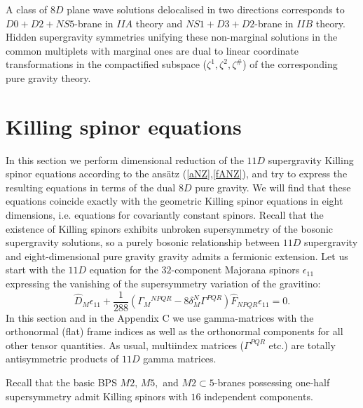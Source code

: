 \documentclass[a4paper,12pt]{article}
\begin{document}
A class of $8D$ plane wave solutions delocalised in two
directions corresponds to $D0+D2+NS5$-brane in $IIA$ theory and
$NS1+D3+D2$-brane in $IIB$ theory. Hidden supergravity
symmetries unifying these non-marginal solutions in the common
multiplets with marginal ones are dual to linear coordinate
transformations in the compactified subspace
($\zeta^1,\zeta^2,\zeta^\#$) of the corresponding pure gravity
theory.


\section{Killing spinor equations} \label{SPINOR}
In this section we perform dimensional reduction of the $11D$
supergravity Killing spinor equations according to the ans\"atz
(\ref{aNZ},\ref{fANZ}), and try to express the resulting
equations in terms of the dual $8D$ pure gravity. We will find
that these equations coincide exactly with the geometric
Killing spinor equations in eight dimensions, i.e. equations
for covariantly constant spinors. Recall that the existence of
Killing spinors exhibits unbroken supersymmetry of the bosonic
supergravity solutions, so a purely bosonic relationship
between $11D$ supergravity and eight-dimensional pure gravity
gravity admits a fermionic extension. Let us start with the
$11D$ equation for the $32$-component Majorana spinors
$\epsilon_{11}$ expressing the vanishing of the supersymmetry
variation of the gravitino:
\begin{equation}
\hat D_M \epsilon_{11} + \frac1{288} \left( \Gamma_M{}^{NPQR} - 8
\delta_M^N \Gamma^{PQR} \right) \hat F_{NPQR} \epsilon_{11} = 0.
\label{SE}
\end{equation}
In this section and in the Appendix C we use gamma-matrices with
the orthonormal (flat) frame indices as well as the orthonormal
components for all other tensor quantities. As usual, multiindex
matrices ($\Gamma^{PQR}$ etc.) are totally antisymmetric products
of $11D$ gamma matrices.

Recall that the basic BPS $M2,\,M5,$ and $M2\subset 5$-branes
possessing one-half supersymmetry admit Killing spinors with $16$
independent components.
\end{document}
